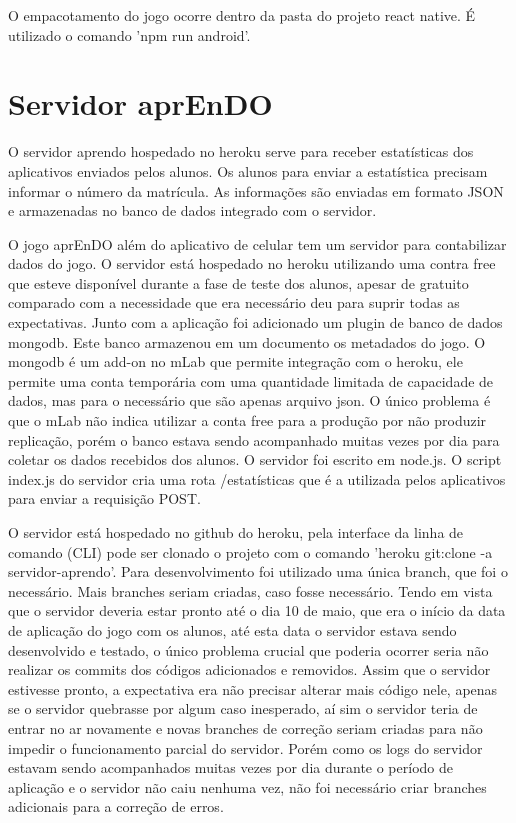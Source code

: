 O empacotamento do jogo ocorre dentro da pasta do projeto react native. É utilizado o comando 'npm run android'.

\section[Servidor aprEnDO]{Servidor aprEnDO}
O servidor aprendo hospedado no heroku serve para receber estatísticas dos aplicativos enviados pelos alunos. Os alunos para enviar a estatística precisam informar o número da matrícula. As informações são enviadas em formato JSON e armazenadas no banco de dados integrado com o servidor.

O jogo aprEnDO além do aplicativo de celular tem um servidor para contabilizar dados do jogo.
O servidor está hospedado no heroku utilizando uma contra free que esteve disponível durante a fase de teste dos alunos, apesar de gratuito comparado com a necessidade que era necessário deu para suprir todas as expectativas. Junto com a aplicação foi adicionado um plugin de banco de dados mongodb. Este banco armazenou em um documento os metadados do jogo. O mongodb é um add-on no mLab que permite integração com o heroku, ele permite uma conta temporária com uma quantidade limitada de capacidade de dados, mas para o necessário que são apenas arquivo json. O único problema é que  o mLab não indica utilizar a conta free para a produção por não produzir replicação, porém o banco estava sendo acompanhado muitas vezes por dia para coletar os dados recebidos dos alunos. 
O servidor foi escrito em node.js. O script index.js do servidor cria uma rota /estatísticas que é a utilizada pelos aplicativos para enviar a requisição POST. 

O servidor está hospedado no github do heroku, pela interface da linha de comando (CLI) pode ser clonado o projeto com o comando 'heroku git:clone -a servidor-aprendo'.
Para desenvolvimento foi utilizado uma única branch, que foi o necessário. Mais branches seriam criadas, caso fosse necessário. Tendo em vista que o servidor deveria estar pronto até o dia 10 de maio, que era o início da data de aplicação do jogo com os alunos, até esta data o servidor estava sendo desenvolvido e testado, o único problema crucial que poderia ocorrer seria não realizar os commits dos códigos adicionados e removidos. Assim que o servidor estivesse pronto, a expectativa era não precisar alterar mais código nele, apenas se o servidor quebrasse por algum caso inesperado, aí sim o servidor teria de entrar no ar novamente e novas branches de correção seriam criadas para não impedir o funcionamento parcial do servidor. Porém como os logs do servidor estavam sendo acompanhados muitas vezes por dia durante o período de aplicação e o servidor não caiu nenhuma vez, não foi necessário criar branches adicionais para a correção de erros. 

